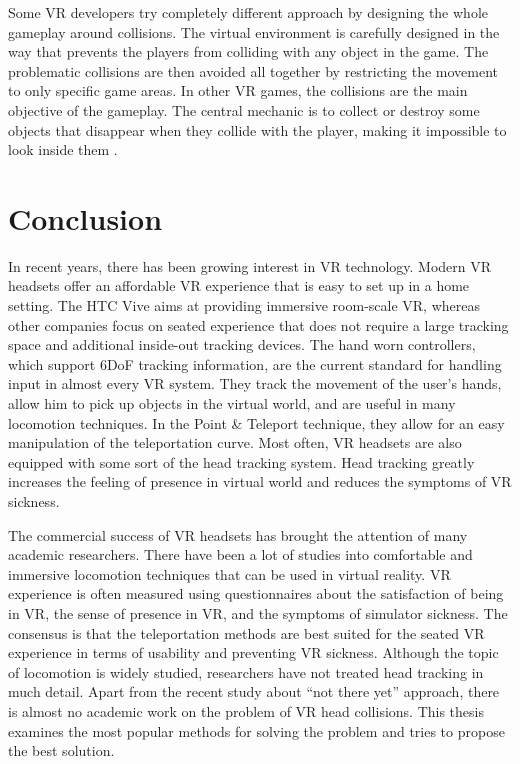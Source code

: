 Some VR developers try completely different approach by designing the whole gameplay around collisions. The virtual environment is carefully designed in the way that prevents the players from colliding with any object in the game. The problematic collisions are then avoided all together by restricting the movement to only specific game areas. In other VR games, the collisions are the main objective of the gameplay. The central mechanic is to collect or destroy some objects that disappear when they collide with the player, making it impossible to look inside them \cite{ELEVR}. 

\section{Conclusion}

In recent years, there has been growing interest in VR technology. Modern VR headsets offer an affordable VR experience that is easy to set up in a home setting. The HTC Vive aims at providing immersive room-scale VR, whereas other companies focus on seated experience that does not require a large tracking space and additional inside-out tracking devices. The hand worn controllers, which support 6DoF tracking information, are the current standard for handling input in almost every VR system. They track the movement of the user's hands, allow him to pick up objects in the virtual world, and are useful in many locomotion techniques. In the Point \& Teleport technique, they allow for an easy manipulation of the teleportation curve. Most often, VR headsets are also equipped with some sort of the head tracking system. Head tracking greatly increases the feeling of presence in virtual world and reduces the symptoms of VR sickness.

The commercial success of VR headsets has brought the attention of many academic researchers. There have been a lot of studies into comfortable and immersive locomotion techniques that can be used in virtual reality. VR experience is often measured using questionnaires about the satisfaction of being in VR, the sense of presence in VR, and the symptoms of simulator sickness. The consensus is that the teleportation methods are best suited for the seated VR experience in terms of usability and preventing VR sickness. Although the topic of locomotion is widely studied, researchers have not treated head tracking in much detail. Apart from the recent study about ``not there yet'' approach, there is almost no academic work on the problem of VR head collisions. This thesis examines the most popular methods for solving the problem and tries to propose the best solution.